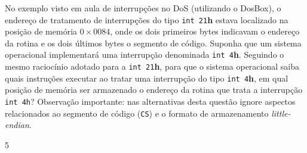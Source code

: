 {
\def\AMCbeginQuestion#1#2{\par\noindent{\bf (PCS3746 - 2025)} #2\hspace*{1em}}
\begin{question}{} No exemplo visto em aula de interrupções no DoS (utilizando o DosBox), o endereço de tratamento de interrupções do tipo \texttt{int 21}\textbf{h} estava localizado na posição de memória $0\times0084$, onde os dois primeiros bytes indicavam o endereço da rotina e os dois últimos bytes o segmento de código. 
Suponha que um sistema operacional implementará uma interrupção denominada \texttt{int 4}\textbf{h}. Seguindo o mesmo raciocínio adotado para a \texttt{int 21}\textbf{h}, para que o sistema operacional saiba quais instruções executar ao tratar uma interrupção do tipo \texttt{int 4}\textbf{h}, em qual posição de memória ser armazenado o endereço da rotina que trata a interrupção \texttt{int 4h}? Observação importante: nas alternativas desta questão ignore aspectos relacionados ao segmento de código (\texttt{CS}) e o formato de armazenamento \emph{little-endian}.

\begin{multicols}{5}\columnseprule=0.1pt
\begin{choices}
\end{choices}
\end{multicols}


\end{question}}
